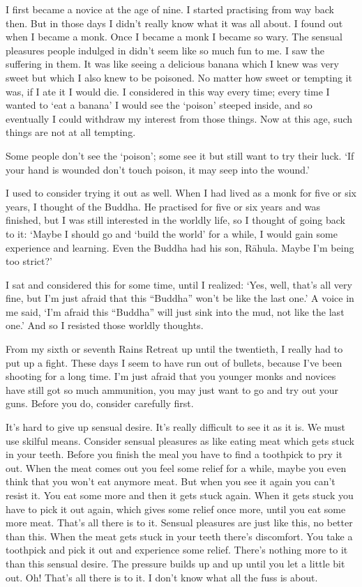I first became a novice at the age of nine. I started practising from way back then. But in those days I didn't really know what it was all about. I found out when I became a monk. Once I became a monk I became so wary. The sensual pleasures people indulged in didn't seem like so much fun to me. I saw the suffering in them. It was like seeing a delicious banana which I knew was very sweet but which I also knew to be poisoned. No matter how sweet or tempting it was, if I ate it I would die. I considered in this way every time; every time I wanted to `eat a banana' I would see the `poison' steeped inside, and so eventually I could withdraw my interest from those things. Now at this age, such things are not at all tempting. 

Some people don't see the `poison'; some see it but still want to try their luck. `If your hand is wounded don't touch poison, it may seep into the wound.' 

I used to consider trying it out as well. When I had lived as a monk for five or six years, I thought of the Buddha. He practised for five or six years and was finished, but I was still interested in the worldly life, so I thought of going back to it: `Maybe I should go and `build the world' for a while, I would gain some experience and learning. Even the Buddha had his son, R\=ahula. Maybe I'm being too strict?' 

I sat and considered this for some time, until I realized: `Yes, well, that's all very fine, but I'm just afraid that this ``Buddha'' won't be like the last one.' A voice in me said, `I'm afraid this ``Buddha'' will just sink into the mud, not like the last one.' And so I resisted those worldly thoughts. 

From my sixth or seventh Rains Retreat up until the twentieth, I really had to put up a fight. These days I seem to have run out of bullets, because I've been shooting for a long time. I'm just afraid that you younger monks and novices have still got so much ammunition, you may just want to go and try out your guns. Before you do, consider carefully first. 

It's hard to give up sensual desire. It's really difficult to see it as it is. We must use skilful means. Consider sensual pleasures as like eating meat which gets stuck in your teeth. Before you finish the meal you have to find a toothpick to pry it out. When the meat comes out you feel some relief for a while, maybe you even think that you won't eat anymore meat. But when you see it again you can't resist it. You eat some more and then it gets stuck again. When it gets stuck you have to pick it out again, which gives some relief once more, until you eat some more meat. That's all there is to it. Sensual pleasures are just like this, no better than this. When the meat gets stuck in your teeth there's discomfort. You take a toothpick and pick it out and experience some relief. There's nothing more to it than this sensual desire. The pressure builds up and up until you let a little bit out. Oh! That's all there is to it. I don't know what all the fuss is about. 

